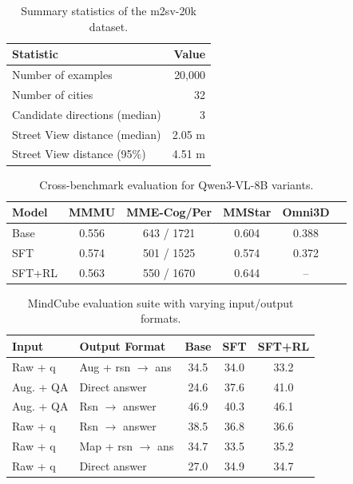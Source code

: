 \begin{table}[t]
  \centering
  \caption{Summary statistics of the m2sv-20k dataset.}
  \label{tab:dataset-stats}
  \begin{tabular}{l r}
    \toprule
    Statistic & Value \\
    \midrule
    Number of examples & 20,000 \\
    Number of cities & 32 \\
    Candidate directions (median) & 3 \\
    Street View distance (median) & 2.05 m \\
    Street View distance (95\%) & 4.51 m \\
    \bottomrule
  \end{tabular}
\end{table}

\begin{table}[t]
  \centering
  \caption{Cross-benchmark evaluation for Qwen3-VL-8B variants.}
  \label{tab:transfer}
  \begin{tabular}{l c c c c c}
    \toprule
    Model & MMMU & MME-Cog/Per & MMStar & Omni3D \\
    \midrule
    Base & 0.556 & 643 / 1721 & 0.604 & 0.388 \\
    SFT & 0.574 & 501 / 1525 & 0.574 & 0.372 \\
    SFT+RL & 0.563 & 550 / 1670 & 0.644 & -- \\
    \bottomrule
  \end{tabular}
\end{table}


\begin{table}[t]
  \centering
  \caption{MindCube evaluation suite with varying input/output formats.}
  \label{tab:m2sv-generalization}
  \begin{tabular}{l l c c c}
    \toprule
    Input & Output Format & Base & SFT & SFT+RL \\
    \midrule
    Raw + q & Aug + rsn $\rightarrow$ ans & 34.5 & 34.0 & 33.2 \\
    Aug. + QA & Direct answer & 24.6 & 37.6 & 41.0 \\
    Aug. + QA & Rsn $\rightarrow$ answer & 46.9 & 40.3 & 46.1 \\
    Raw + q & Rsn $\rightarrow$ answer & 38.5 & 36.8 & 36.6 \\
    Raw + q & Map + rsn $\rightarrow$ ans & 34.7 & 33.5 & 35.2 \\
    Raw + q & Direct answer & 27.0 & 34.9 & 34.7 \\
    \bottomrule
  \end{tabular}
\end{table}


